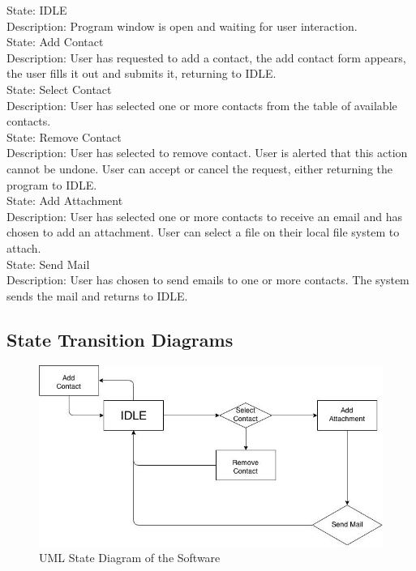 \documentclass{article}
\begin{document}
State: IDLE \\
Description: Program window is open and waiting for user interaction. \\

State: Add Contact \\
Description: User has requested to add a contact, the add contact form appears, the user fills it out and submits it, returning to IDLE. \\

State: Select Contact \\
Description: User has selected one or more contacts from the table of available contacts. \\

State: Remove Contact \\
Description: User has selected to remove contact. User is alerted that this action cannot be undone. User can accept or cancel the request, either returning the program to IDLE. \\

State: Add Attachment \\
Description: User has selected one or more contacts to receive an email and has chosen to add an attachment. User can select a file on their local file system to attach. \\

State: Send Mail \\
Description: User has chosen to send emails to one or more contacts. The system sends the mail and returns to IDLE. \\


\subsection{State Transition Diagrams}
\begin{figure}[H]
\centering
\includegraphics[width=140mm]{img/finalDiagrams/StateDiagram.jpg}
\caption{UML State Diagram of the Software \label{State}}
\end{figure}
\end{document}
